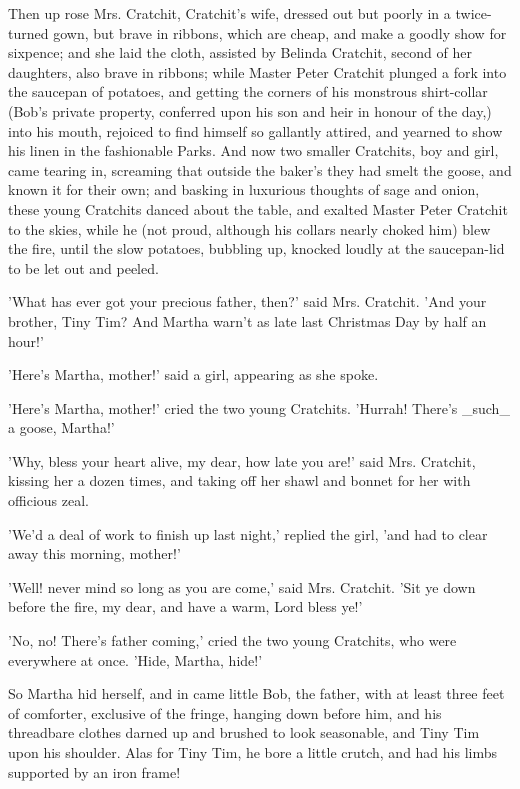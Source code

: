 Then up rose Mrs. Cratchit, Cratchit's wife, dressed out but poorly in a
twice-turned gown, but brave in ribbons, which are cheap, and make a
goodly show for sixpence; and she laid the cloth, assisted by Belinda
Cratchit, second of her daughters, also brave in ribbons; while Master
Peter Cratchit plunged a fork into the saucepan of potatoes, and getting
the corners of his monstrous shirt-collar (Bob's private property,
conferred upon his son and heir in honour of the day,) into his mouth,
rejoiced to find himself so gallantly attired, and yearned to show his
linen in the fashionable Parks. And now two smaller Cratchits, boy and
girl, came tearing in, screaming that outside the baker's they had smelt
the goose, and known it for their own; and basking in luxurious thoughts
of sage and onion, these young Cratchits danced about the table, and
exalted Master Peter Cratchit to the skies, while he (not proud,
although his collars nearly choked him) blew the fire, until the slow
potatoes, bubbling up, knocked loudly at the saucepan-lid to be let out
and peeled.

'What has ever got your precious father, then?' said Mrs. Cratchit. 'And
your brother, Tiny Tim? And Martha warn't as late last Christmas Day by
half an hour!'

'Here's Martha, mother!' said a girl, appearing as she spoke.

'Here's Martha, mother!' cried the two young Cratchits. 'Hurrah! There's
_such_ a goose, Martha!'

'Why, bless your heart alive, my dear, how late you are!' said Mrs.
Cratchit, kissing her a dozen times, and taking off her shawl and bonnet
for her with officious zeal.

'We'd a deal of work to finish up last night,' replied the girl, 'and
had to clear away this morning, mother!'

'Well! never mind so long as you are come,' said Mrs. Cratchit. 'Sit ye
down before the fire, my dear, and have a warm, Lord bless ye!'

'No, no! There's father coming,' cried the two young Cratchits, who were
everywhere at once. 'Hide, Martha, hide!'

So Martha hid herself, and in came little Bob, the father, with at least
three feet of comforter, exclusive of the fringe, hanging down before
him, and his threadbare clothes darned up and brushed to look
seasonable, and Tiny Tim upon his shoulder. Alas for Tiny Tim, he bore a
little crutch, and had his limbs supported by an iron frame!

